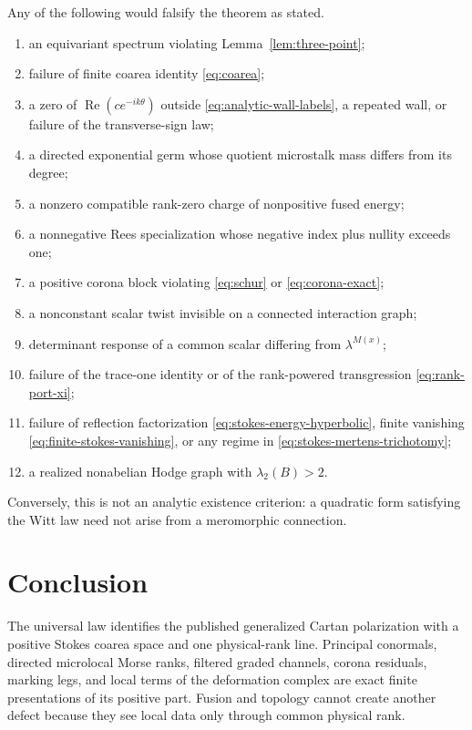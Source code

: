 \documentclass[11pt,a4paper]{amsart}
\theoremstyle{plain}
\theoremstyle{definition}
\begin{document}
Any of the following would falsify the theorem as stated.
\begin{enumerate}[label=(\arabic*),leftmargin=2.2em]
\item an equivariant spectrum violating Lemma~\ref{lem:three-point};
\item failure of finite coarea identity \eqref{eq:coarea};
\item a zero of $\operatorname{Re}(ce^{-ik\theta})$ outside
      \eqref{eq:analytic-wall-labels}, a repeated wall, or failure of the transverse-sign law;
\item a directed exponential germ whose quotient microstalk mass differs from its degree;
\item a nonzero compatible rank-zero charge of nonpositive fused energy;
\item a nonnegative Rees specialization whose negative index plus nullity exceeds one;
\item a positive corona block violating \eqref{eq:schur} or \eqref{eq:corona-exact};
\item a nonconstant scalar twist invisible on a connected interaction graph;
\item determinant response of a common scalar differing from $\lambda^{M(x)}$;
\item failure of the trace-one identity or of the rank-powered transgression
      \eqref{eq:rank-port-xi};
\item failure of reflection factorization \eqref{eq:stokes-energy-hyperbolic}, finite vanishing
      \eqref{eq:finite-stokes-vanishing}, or any regime in
      \eqref{eq:stokes-mertens-trichotomy};
\item a realized nonabelian Hodge graph with $\lambda_2(B)>2$.
\end{enumerate}
Conversely, this is not an analytic existence criterion: a quadratic form satisfying the Witt law
need not arise from a meromorphic connection.

\section{Conclusion}

The universal law identifies the published generalized Cartan polarization with a positive Stokes
coarea space and one physical-rank line.  Principal conormals, directed microlocal Morse ranks,
filtered graded channels, corona residuals, marking legs, and local terms of the deformation
complex are exact finite presentations of its positive part.  Fusion and topology cannot create
another defect because they see local data only through common physical rank.
\end{document}
